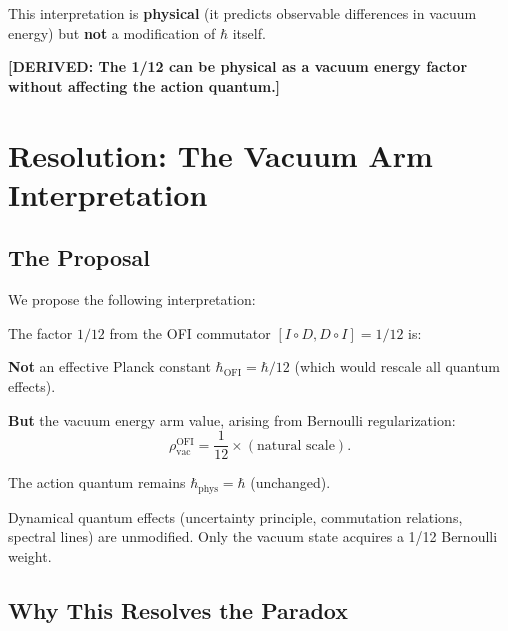 \documentclass[12pt]{article}
\theoremstyle{definition}
\newcommand{\rhovac}{\rho_{\mathrm{vac}}}
\newcommand{\DERIVED}[1]{\textcolor{derivedcolor}{\textbf{[DERIVED: #1]}}}
\begin{document}
This interpretation is \textbf{physical} (it predicts observable differences in vacuum
energy) but \textbf{not} a modification of $\hbar$ itself.

\DERIVED{The 1/12 can be physical as a vacuum energy factor without affecting the action
quantum.}

\section{Resolution: The Vacuum Arm Interpretation}
\label{sec:resolution}

\subsection{The Proposal}

We propose the following interpretation:
\begin{tcolorbox}[resultbox, title=The Vacuum Arm Interpretation of hbar_OFI]
The factor $1/12$ from the OFI commutator $[I\circ D, D\circ I] = 1/12$ is:

\textbf{Not} an effective Planck constant $\hbar_{\mathrm{OFI}} = \hbar/12$ (which would
rescale all quantum effects).

\textbf{But} the vacuum energy arm value, arising from Bernoulli regularization:
\begin{equation}
  \rhovac^{\mathrm{OFI}} = \frac{1}{12} \times (\text{natural scale}).
\end{equation}

The action quantum remains $\hbar_{\mathrm{phys}} = \hbar$ (unchanged).

Dynamical quantum effects (uncertainty principle, commutation relations, spectral lines)
are unmodified. Only the vacuum state acquires a 1/12 Bernoulli weight.
\end{tcolorbox}

\subsection{Why This Resolves the Paradox}
\end{document}
